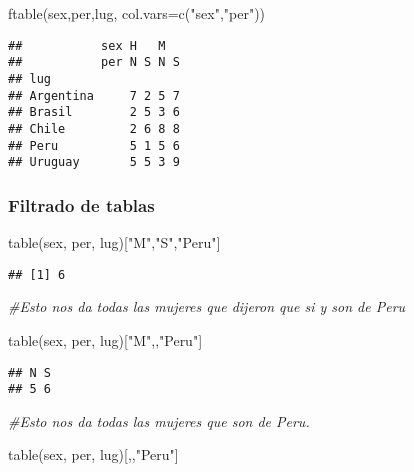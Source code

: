\documentclass[
]{article}
\newenvironment{Shaded}{\begin{snugshade}}{\end{snugshade}}
\newcommand{\AttributeTok}[1]{\textcolor[rgb]{0.77,0.63,0.00}{#1}}
\newcommand{\CommentTok}[1]{\textcolor[rgb]{0.56,0.35,0.01}{\textit{#1}}}
\newcommand{\FunctionTok}[1]{\textcolor[rgb]{0.00,0.00,0.00}{#1}}
\newcommand{\NormalTok}[1]{#1}
\newcommand{\StringTok}[1]{\textcolor[rgb]{0.31,0.60,0.02}{#1}}
\begin{document}
\begin{Shaded}
\begin{Highlighting}[]
\FunctionTok{ftable}\NormalTok{(sex,per,lug, }\AttributeTok{col.vars=}\FunctionTok{c}\NormalTok{(}\StringTok{"sex"}\NormalTok{,}\StringTok{"per"}\NormalTok{))}
\end{Highlighting}
\end{Shaded}

\begin{verbatim}
##           sex H   M  
##           per N S N S
## lug                  
## Argentina     7 2 5 7
## Brasil        2 5 3 6
## Chile         2 6 8 8
## Peru          5 1 5 6
## Uruguay       5 5 3 9
\end{verbatim}

\hypertarget{filtrado-de-tablas}{%
\subsubsection{Filtrado de tablas}\label{filtrado-de-tablas}}

\begin{Shaded}
\begin{Highlighting}[]
\FunctionTok{table}\NormalTok{(sex, per, lug)[}\StringTok{"M"}\NormalTok{,}\StringTok{"S"}\NormalTok{,}\StringTok{"Peru"}\NormalTok{]}
\end{Highlighting}
\end{Shaded}

\begin{verbatim}
## [1] 6
\end{verbatim}

\begin{Shaded}
\begin{Highlighting}[]
\CommentTok{\#Esto nos da todas las mujeres que dijeron que si y son de Peru}

\FunctionTok{table}\NormalTok{(sex, per, lug)[}\StringTok{"M"}\NormalTok{,,}\StringTok{"Peru"}\NormalTok{]}
\end{Highlighting}
\end{Shaded}

\begin{verbatim}
## N S 
## 5 6
\end{verbatim}

\begin{Shaded}
\begin{Highlighting}[]
\CommentTok{\#Esto nos da todas las mujeres que son de Peru.}

\FunctionTok{table}\NormalTok{(sex, per, lug)[,,}\StringTok{"Peru"}\NormalTok{]}
\end{Highlighting}
\end{Shaded}
\end{document}
